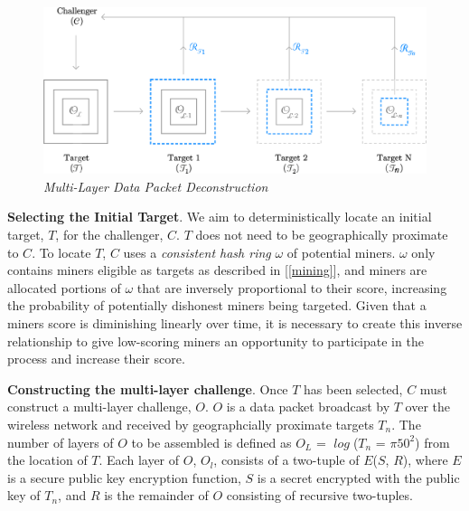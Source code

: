 \documentclass[letterpaper,11pt]{article}
\begin{document}
\begin{figure}[H]
	\begin{center}
  		\includegraphics[width=\textwidth]{diagram2.eps}
  		\caption{\textit{Multi-Layer Data Packet Deconstruction}}
  		\label{fig:poc-construction}
 	\end{center}
\end{figure}

\textbf{Selecting the Initial Target}. We aim to deterministically locate an initial target, $\mathit{T}$, for the challenger, $\mathit{C}$. $\mathit{T}$ does not need to be geographically proximate to $\mathit{C}$. To locate $\mathit{T}$, $\mathit{C}$ uses a \textit{consistent hash ring} $\mathit{\omega}$ of potential miners. $\mathit{\omega}$ only contains miners eligible as targets as described in [\ref{mining}], and miners are allocated portions of $\mathit{\omega}$ that are inversely proportional to their score, increasing the probability of potentially dishonest miners being targeted. Given that a miners score is diminishing linearly over time, it is necessary to create this inverse relationship to give low-scoring miners an opportunity to participate in the process and increase their score.\newline

\textbf{Constructing the multi-layer challenge}. Once $\mathit{T}$ has been selected, $\mathit{C}$ must construct a multi-layer challenge, $\mathit{O}$. $\mathit{O}$ is a data packet broadcast by $\mathit{T}$ over the wireless network and received by geographcially proximate targets $\mathit{T_n}$. The number of layers of $\mathit{O}$ to be assembled is defined as $\mathit{O_L}$ = $\mathit{\log}$($\mathit{T_n}$ = $\mathit{\pi}$$\mathit{50^2}$) from the location of $\mathit{T}$. Each layer of $\mathit{O}$, $\mathit{O_l}$, consists of a two-tuple of $\mathit{E}$($\mathit{S}$, $\mathit{R}$), where $\mathit{E}$ is a secure public key encryption function, $\mathit{S}$ is a secret encrypted with the public key of $\mathit{T_n}$, and $\mathit{R}$ is the remainder of $\mathit{O}$ consisting of recursive two-tuples.\newline
\end{document}
